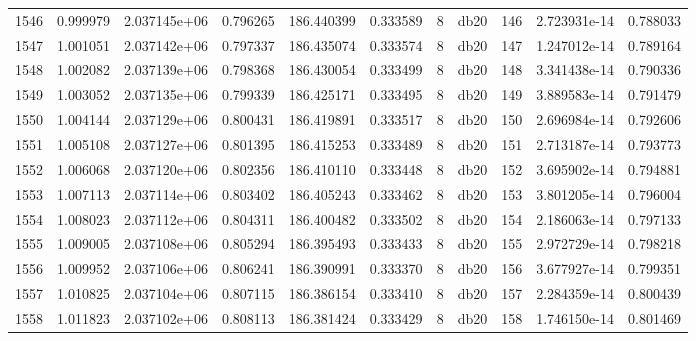 \begin{tabular}{lrrrrrrlrrr}
1546 &    0.999979 &        2.037145e+06 &  0.796265 &              186.440399 &    0.333589 &       8 &         db20 &    146 &   2.723931e-14 &      0.788033 \\
1547 &    1.001051 &        2.037142e+06 &  0.797337 &              186.435074 &    0.333574 &       8 &         db20 &    147 &   1.247012e-14 &      0.789164 \\
1548 &    1.002082 &        2.037139e+06 &  0.798368 &              186.430054 &    0.333499 &       8 &         db20 &    148 &   3.341438e-14 &      0.790336 \\
1549 &    1.003052 &        2.037135e+06 &  0.799339 &              186.425171 &    0.333495 &       8 &         db20 &    149 &   3.889583e-14 &      0.791479 \\
1550 &    1.004144 &        2.037129e+06 &  0.800431 &              186.419891 &    0.333517 &       8 &         db20 &    150 &   2.696984e-14 &      0.792606 \\
1551 &    1.005108 &        2.037127e+06 &  0.801395 &              186.415253 &    0.333489 &       8 &         db20 &    151 &   2.713187e-14 &      0.793773 \\
1552 &    1.006068 &        2.037120e+06 &  0.802356 &              186.410110 &    0.333448 &       8 &         db20 &    152 &   3.695902e-14 &      0.794881 \\
1553 &    1.007113 &        2.037114e+06 &  0.803402 &              186.405243 &    0.333462 &       8 &         db20 &    153 &   3.801205e-14 &      0.796004 \\
1554 &    1.008023 &        2.037112e+06 &  0.804311 &              186.400482 &    0.333502 &       8 &         db20 &    154 &   2.186063e-14 &      0.797133 \\
1555 &    1.009005 &        2.037108e+06 &  0.805294 &              186.395493 &    0.333433 &       8 &         db20 &    155 &   2.972729e-14 &      0.798218 \\
1556 &    1.009952 &        2.037106e+06 &  0.806241 &              186.390991 &    0.333370 &       8 &         db20 &    156 &   3.677927e-14 &      0.799351 \\
1557 &    1.010825 &        2.037104e+06 &  0.807115 &              186.386154 &    0.333410 &       8 &         db20 &    157 &   2.284359e-14 &      0.800439 \\
1558 &    1.011823 &        2.037102e+06 &  0.808113 &              186.381424 &    0.333429 &       8 &         db20 &    158 &   1.746150e-14 &      0.801469 \\

\end{tabular}
